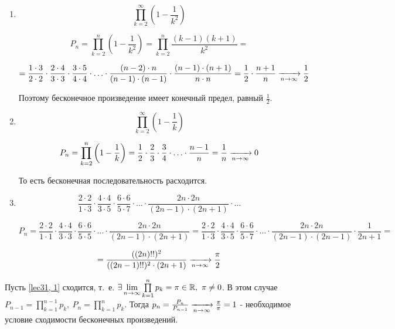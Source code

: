 \documentclass[../../main.tex]{subfiles}
\begin{document}
	\begin{example}
		\begin{enumerate}[label=\arabic*)]
			\item \[ \prod\limits_{k = 2}^{\infty} \left(1 - \frac{1}{k^2}\right) \]
			
			\[P_n = \prod\limits_{k = 2}^{n} \left(1 - \frac{1}{k^2}\right) = 
			\prod\limits_{k = 2}^{n} \frac{(k - 1)(k + 1)}{k^2} = \]
			
			\[= \frac{1 \cdot 3}{2 \cdot 2} \cdot \frac{2 \cdot 4}{3 \cdot 3} \cdot 
			\frac{3 \cdot 5}{4 \cdot 4} \cdot \ldots \cdot \frac{(n - 2) \cdot n}{(n - 
			1) \cdot (n - 1)} \cdot \frac{(n - 1) \cdot (n + 1)}{n \cdot n} = 
			\frac{1}{2} \cdot \frac{n + 1}{n} \xrightarrow[n \to \infty]{} \frac{1}{2}\]
			
			Поэтому бесконечное произведение имеет конечный предел, равный 
			$\frac{1}{2}$.
			
			\item  \[ \prod\limits_{k = 2}^{\infty} \left(1 - \frac{1}{k}\right) \]
			
			\[P_n = \prod\limits_{k = 2}^{n} \left(1 - \frac{1}{k}\right) = \frac{1}{2} 
			\cdot \frac{2}{3} \cdot \frac{3}{4} \cdot \ldots \cdot \frac{n - 1}{n} = 
			\frac{1}{n} \xrightarrow[n \to \infty]{} 0\]
			
			То есть бесконечная последовательность расходится.
			
			\item \[ \frac{2 \cdot 2}{1 \cdot 3} \cdot \frac{4 \cdot 4}{3 \cdot 5} 
			\cdot \frac{6 \cdot 6}{5 \cdot 7} \cdot \ldots \cdot \frac{2n \cdot 2n}{(2n 
			- 1) \cdot (2n + 1)} \cdot \ldots\]
			
			\[ P_n = \frac{2 \cdot 2}{1 \cdot 1} \cdot \frac{4 \cdot 4}{3 \cdot 3} 
			\cdot \frac{6 \cdot 6}{5 \cdot 5} \cdot \ldots \cdot \frac{2n \cdot 2n}{(2n 
			- 1) \cdot (2n + 1)} = \frac{2 \cdot 2}{1 \cdot 3} \cdot \frac{4 \cdot 4}{3 
			\cdot 5} \cdot \frac{6 \cdot 6}{5 \cdot 7} \cdot \ldots \cdot \frac{2n 
			\cdot 2n}{(2n - 1) \cdot (2n - 1)} \cdot \frac{1}{2n + 1} = \]
			
			\[= \frac{((2n)!!)^2}{((2n - 1)!!)^2 \cdot (2n + 1)} \xrightarrow[n \to \infty]{} 
			\frac{\pi}{2}\]
		\end{enumerate}
	\end{example}
	Пусть \eqref{lec31, 1} сходится, т.~е. $\exists \lim\limits_{n \to \infty} 
	\prod\limits_{k = 1}^{n} p_k = \pi \in \mathbb{R},\ \pi \neq 0$. В этом случае $P_{n 
	- 1} = \prod\limits_{k = 1}^{n - 1}p_k,\ P_{n} = \prod\limits_{k = 
	1}^{n}p_k$. Тогда $p_n = \frac{P_n}{P_{n - 1}} \xrightarrow[n \to \infty]{} 
	\frac{\pi}{\pi} = 1$ - необходимое условие сходимости бесконечных 
	произведений.
		
\end{document}
